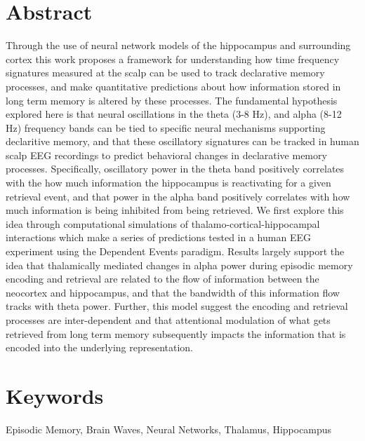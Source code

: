 \documentclass[11pt, titlepage, twoside]{article}
\begin{document}
\section*{Abstract}\label{sec:abstract}
Through the use of neural network models of the hippocampus and surrounding cortex this work proposes a framework for understanding how time frequency signatures measured at the scalp can be used to track declarative memory processes, and make quantitative predictions about how information stored in long term memory is altered by these processes.  The fundamental hypothesis explored here is that neural oscillations in the theta (3-8 Hz), and alpha (8-12 Hz) frequency bands can be tied to specific neural mechanisms supporting declaritive memory, and that these oscillatory signatures can be tracked in human scalp EEG recordings to predict behavioral changes in declarative memory processes. Specifically, oscillatory power in the theta band positively correlates with the how much information the hippocampus is reactivating for a given retrieval event, and that power in the alpha band positively correlates with how much information is being inhibited from being retrieved.  We first explore this idea through computational simulations of thalamo-cortical-hippocampal interactions which make a series of predictions tested in a human EEG experiment using the Dependent Events paradigm.  Results largely support the idea that thalamically mediated changes in alpha power during episodic memory encoding and retrieval are related to the flow of information between the neocortex and hippocampus, and that the bandwidth of this information flow tracks with theta power.  Further, this model suggest the encoding and retrieval processes are inter-dependent and that attentional modulation of what gets retrieved from long term memory subsequently impacts the information that is encoded into the underlying representation.

\section*{Keywords}
Episodic Memory, Brain Waves, Neural Networks, Thalamus, Hippocampus
\end{document}

